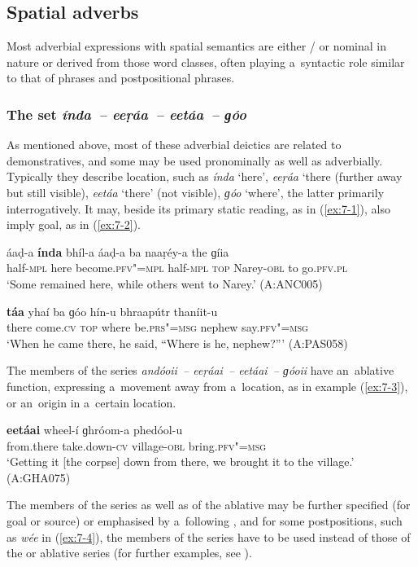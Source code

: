 \subsection{Spatial adverbs}
\label{subsec:7-1-2}

Most adverbial expressions with spatial semantics are either / or nominal in nature or derived from those word classes, often playing a~syntactic role similar to that of  phrases and postpositional phrases.

\subsubsection*{The  set \textit{índa~-- eeṛáa~-- eetáa~-- ɡóo}}

As mentioned above, most of these adverbial deictics are related to demonstratives, and some may be
used pronominally as well as adverbially. Typically they describe location, such as \textit{índa} `here', \textit{eeṛáa} `there (further away but still visible),
\textit{eetáa} `there' (not visible), \textit{ɡóo} `where', the latter primarily
interrogatively. It may, beside its primary static reading, as in (\ref{ex:7-1}), also imply goal, as in
(\ref{ex:7-2}).

\begin{exe}
\ex
\label{ex:7-1}
\gll áaḍ-a \textbf{índa} bhíl-a áaḍ-a ba naaṛéy-a  the ɡíia \\
half-\textsc{mpl} here become.\textsc{pfv"=mpl} half-\textsc{mpl} \textsc{top} Narey-\textsc{obl}  to  go.\textsc{pfv.pl}  \\
\glt `Some remained here, while others went to Narey.' (A:ANC005)

\ex
\label{ex:7-2}
\gll \textbf{táa} yhaí ba ɡóo hín-u bhraapútr  thaníit-u \\
there come.\textsc{cv} \textsc{top} where be.\textsc{prs"=msg} nephew  say.\textsc{pfv"=msg} \\
\glt `When he came there, he said, ``Where is he, nephew?''' (A:PAS058)
\end{exe}
The members of the series \textit{andóoii~-- eeṛáai~-- eetáai~-- ɡóoii} have an~ablative function,
expressing a~movement away from a~location, as in example (\ref{ex:7-3}), or an~origin in a~certain
location.

\begin{exe}
\ex
\label{ex:7-3}
\gll \textbf{eetáai} wheel-í ɡhróom-a phedóol-u \\
from.there take.down-\textsc{cv} village-\textsc{obl} bring.\textsc{pfv"=msg} \\
\glt `Getting it [the corpse] down from there, we brought it to the village.' (A:GHA075)
\end{exe}
The members of the  series as well as of the ablative may be further specified (for goal or
source) or emphasised by a~following , and for some postpositions, such as \textit{wée}
in (\ref{ex:7-4}), the members of the  series have to be used instead of those of the
 or ablative series (for further examples, see ).

